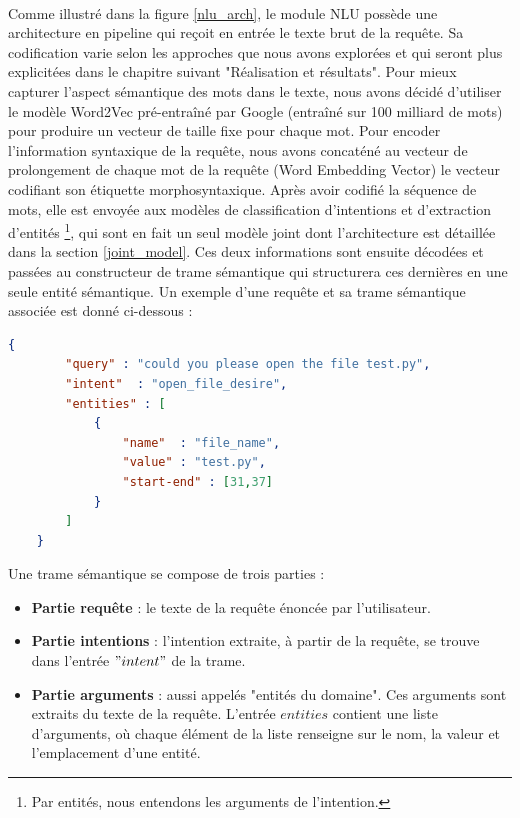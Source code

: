 	\paragraph{}
	\label{encoding}
	Comme illustré dans la figure \ref{nlu_arch}, le module NLU possède une architecture en pipeline qui reçoit en entrée le texte brut de la requête. Sa codification varie selon les approches que nous avons explorées et qui seront plus explicitées dans le chapitre suivant "Réalisation et résultats". Pour mieux capturer l'aspect sémantique des mots dans le texte, nous avons décidé d'utiliser le modèle Word2Vec pré-entraîné par Google (entraîné sur 100 milliard de mots) pour produire un vecteur de taille fixe pour chaque mot. Pour encoder l'information syntaxique de la requête, nous avons concaténé au vecteur de prolongement de chaque mot de la requête (Word Embedding Vector) le vecteur codifiant son étiquette morphosyntaxique. Après avoir codifié la séquence de mots, elle est envoyée aux modèles de classification d'intentions et d'extraction d'entités \footnote{Par entités, nous entendons les arguments de l'intention.}, qui sont en fait un seul modèle joint dont l'architecture est détaillée dans la section \ref{joint_model}. Ces deux informations sont ensuite décodées et passées au constructeur de trame sémantique qui structurera ces dernières en une seule entité sémantique. Un exemple d'une requête et sa trame sémantique associée est donné ci-dessous :
	\begin{lstlisting}[language=json]
	{	
		"query"	: "could you please open the file test.py",
		"intent"  : "open_file_desire",
		"entities" : [
			{	
				"name"	: "file_name",
				"value"	: "test.py",
				"start-end"	: [31,37]
			}
		]
	}
	\end{lstlisting}
	\par
	Une trame sémantique se compose de trois parties :
	\begin{itemize}
		\item \textbf{Partie requête} : le texte de la requête énoncée par l'utilisateur.
		\item \textbf{Partie intentions} : l'intention extraite, à partir de la requête, se trouve dans l'entrée $"intent"$ de la trame.
		\item \textbf{Partie arguments} : aussi appelés "entités du domaine". Ces arguments sont extraits du texte de la requête. L'entrée $entities$ contient une liste d'arguments, où chaque élément de la liste renseigne sur le nom, la valeur et l'emplacement d'une entité.
	\end{itemize}
